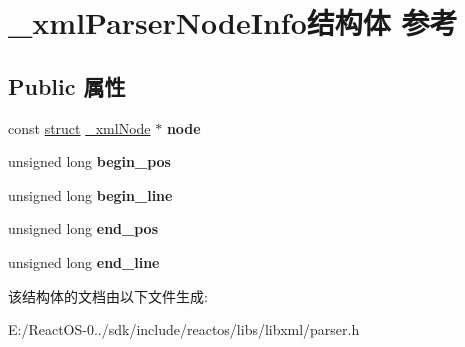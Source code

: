 \hypertarget{struct__xml_parser_node_info}{}\section{\+\_\+xml\+Parser\+Node\+Info结构体 参考}
\label{struct__xml_parser_node_info}
\subsection*{Public 属性}
\begin{DoxyCompactItemize}
\item 
\mbox{\label{struct__xml_parser_node_info_a046818d3566f725977753bdadfabb139}} 
const \hyperlink{interfacestruct}{struct} \hyperlink{struct__xml_node}{\+\_\+xml\+Node} $\ast$ {\bfseries node}
\item 
\mbox{\label{struct__xml_parser_node_info_aac2db2491fa013f83690d76b9a7ceac8}} 
unsigned long {\bfseries begin\+\_\+pos}
\item 
\mbox{\label{struct__xml_parser_node_info_a3448ffcf43452efe92349091c18f7a79}} 
unsigned long {\bfseries begin\+\_\+line}
\item 
\mbox{\label{struct__xml_parser_node_info_a7f3a471cff4019bb37cece9d2d55b863}} 
unsigned long {\bfseries end\+\_\+pos}
\item 
\mbox{\label{struct__xml_parser_node_info_a97d627e7277aea0cca01ba5ca08c93cd}} 
unsigned long {\bfseries end\+\_\+line}
\end{DoxyCompactItemize}


该结构体的文档由以下文件生成\+:\begin{DoxyCompactItemize}
\item 
E\+:/\+React\+O\+S-\/0../sdk/include/reactos/libs/libxml/parser.\+h\end{DoxyCompactItemize}
